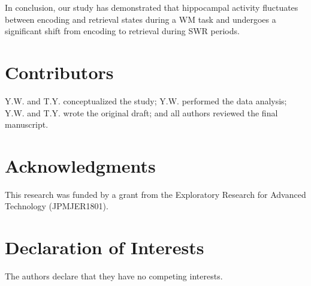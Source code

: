 \documentclass[final,3p,times,twocolumn]{elsarticle}
\begin{document}
In conclusion, our study has demonstrated that hippocampal activity fluctuates between encoding and retrieval states during a WM task and undergoes a significant shift from encoding to retrieval during SWR periods.

\label{sec:discussion}





% 

% 





\section*{Contributors}
Y.W. and T.Y. conceptualized the study; Y.W. performed the data analysis; Y.W. and T.Y. wrote the original draft; and all authors reviewed the final manuscript.
\label{contributors}

\section*{Acknowledgments}
This research was funded by a grant from the Exploratory Research for Advanced Technology (JPMJER1801).
\label{acknowledgments}

\section*{Declaration of Interests}
The authors declare that they have no competing interests.
\label{declaration of interests}
\end{document}
